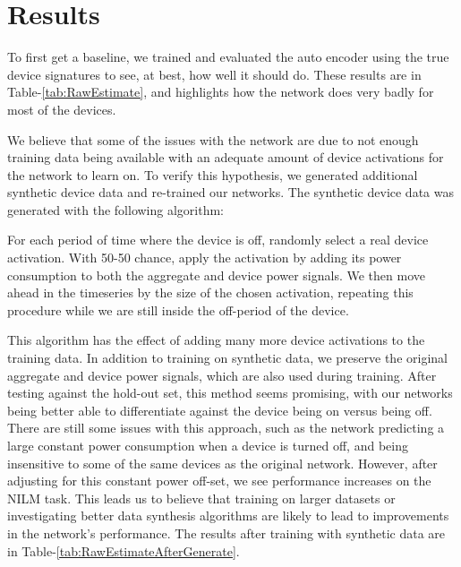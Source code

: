 \documentclass{article}
\begin{document}
\section{Results}


To first get a baseline, we trained and evaluated the auto encoder using the true device signatures to see, at best, how well it should do.
These results are in Table-\ref{tab:RawEstimate}, and highlights how the network does very badly for most of the devices.

We believe that some of the issues with the network are due to not enough training data being available with an adequate amount of device activations for the network to learn on.
To verify this hypothesis, we generated additional synthetic device data and re-trained our networks.
The synthetic device data was generated with the following algorithm:

For each period of time where the device is off, randomly select a real device activation.
With 50-50 chance, apply the activation by adding its power consumption to both the aggregate and device power signals.
We then move ahead in the timeseries by the size of the chosen activation, repeating this procedure while we are still inside the off-period of the device.

This algorithm has the effect of adding many more device activations to the training data.
In addition to training on synthetic data, we preserve the original aggregate and device power signals, which are also used during training.
After testing against the hold-out set, this method seems promising, with our networks being better able to differentiate against the device being on versus being off.
There are still some issues with this approach, such as the network predicting a large constant power consumption when a device is turned off, and being insensitive to some of the same devices as the original network.
However, after adjusting for this constant power off-set, we see performance increases on the NILM task.
This leads us to believe that training on larger datasets or investigating better data synthesis algorithms are likely to lead to improvements in the network's performance.
The results after training with synthetic data are in Table-\ref{tab:RawEstimateAfterGenerate}.
\end{document}
